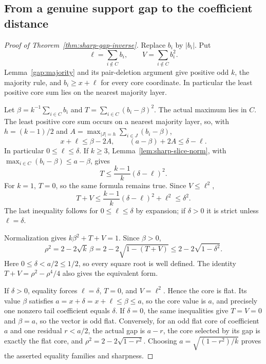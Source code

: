 \documentclass[11pt]{article}
\theoremstyle{remark}\newtheorem{remark}[theorem]{Remark}
\begin{document}
\subsection{From a genuine support gap to the coefficient distance}

\begin{proof}[Proof of Theorem~\ref{thm:sharp-gap-inverse}]
Replace $b_i$ by $|b_i|$. Put
\[
 \ell=\sum_{i\notin C}b_i,\qquad V=\sum_{i\notin C}b_i^2.
\]
Lemma~\ref{gap:majority} and its pair-deletion argument give positive
odd $k$, the majority rule, and $b_i\ge x+\ell$ for every core
coordinate. In particular the least positive core sum lies on the
nearest majority layer.

Let $\beta=k^{-1}\sum_{i\in C}b_i$ and
$T=\sum_{i\in C}(b_i-\beta)^2$. The actual maximum lies in $C$.
The least positive core sum occurs on a nearest majority layer, so, with
$h=(k-1)/2$ and $A=\max_{|J|=h}\sum_{i\in J}(b_i-\beta)$,
\[
 x+\ell\le\beta-2A,
 \qquad (a-\beta)+2A\le\delta-\ell.
\]
In particular $0\le\ell\le\delta$.
If $k\ge3$, Lemma~\ref{lem:sharp-slice-norm}, with
$\max_{i\in C}(b_i-\beta)\le a-\beta$, gives
\begin{equation}\label{eq:gap-variance-defect}
 T\le\frac{k-1}{k}(\delta-\ell)^2.
\end{equation}
For $k=1$, $T=0$, so the same formula remains true.
Since $V\le\ell^2$,
\begin{equation}\label{eq:total-defect}
 T+V\le\frac{k-1}{k}(\delta-\ell)^2+\ell^2\le\delta^2.
\end{equation}
The last inequality follows for $0\le\ell\le\delta$ by expansion;
if $\delta>0$ it is strict unless $\ell=\delta$.

Normalization gives $k\beta^2+T+V=1$. Since $\beta>0$,
\[
 \rho^2=2-2\sqrt{k}\,\beta
       =2-2\sqrt{1-(T+V)}
       \le2-2\sqrt{1-\delta^2}.
\]
Here $0\le\delta<a/2\le1/2$, so every square root is well defined.
The identity $T+V=\rho^2-\rho^4/4$ also gives the equivalent form.

If $\delta>0$, equality forces $\ell=\delta$, $T=0$, and
$V=\ell^2$. Hence the core is flat. Its value $\beta$ satisfies
$a=x+\delta=x+\ell\le\beta\le a$, so the core value is $a$,
and precisely one nonzero tail coefficient equals $\delta$.
If $\delta=0$, the same inequalities give $T=V=0$ and $\beta=a$, so
the vector is odd flat. Conversely, for an odd flat core of coefficient
$a$ and one residual $r<a/2$, the actual gap is $a-r$, the core selected by its gap
is exactly the flat core, and
$\rho^2=2-2\sqrt{1-r^2}$. Choosing
$a=\sqrt{(1-r^2)/k}$ proves the asserted equality families and sharpness.
\end{proof}
\end{document}
